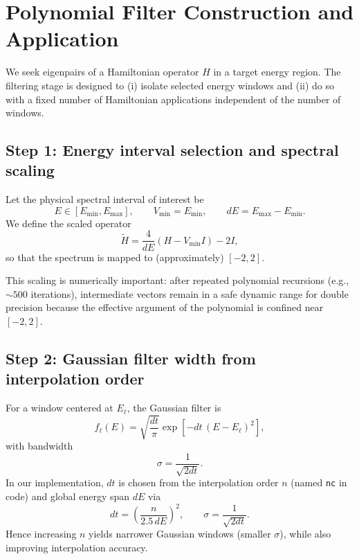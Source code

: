 \section{Polynomial Filter Construction and Application}
\label{sec:filter}

We seek eigenpairs of a Hamiltonian operator $H$ in a target energy region.
The filtering stage is designed to (i) isolate selected energy windows and
(ii) do so with a fixed number of Hamiltonian applications independent of the
number of windows.

\subsection{Step 1: Energy interval selection and spectral scaling}

Let the physical spectral interval of interest be
\begin{equation}
E \in [E_{\min},E_{\max}], \qquad
V_{\min}=E_{\min}, \qquad dE = E_{\max}-E_{\min}.
\end{equation}
We define the scaled operator
\begin{equation}
\widetilde{H} = \frac{4}{dE}(H - V_{\min}I) - 2I,
\label{eq:Hscale}
\end{equation}
so that the spectrum is mapped to (approximately) $[-2,2]$.

This scaling is numerically important: after repeated polynomial recursions
(e.g., $\sim 500$ iterations), intermediate vectors remain in a safe dynamic
range for double precision because the effective argument of the polynomial is
confined near $[-2,2]$.

\subsection{Step 2: Gaussian filter width from interpolation order}

For a window centered at $E_\ell$, the Gaussian filter is
\begin{equation}
f_\ell(E)=\sqrt{\frac{dt}{\pi}}\exp\!\left[-dt\,(E-E_\ell)^2\right],
\end{equation}
with bandwidth
\begin{equation}
\sigma = \frac{1}{\sqrt{2dt}}.
\end{equation}
In our implementation, $dt$ is chosen from the interpolation order $n$ (named
\texttt{nc} in code) and global energy span $dE$ via
\begin{equation}
dt = \left(\frac{n}{2.5\,dE}\right)^2,
\qquad
\sigma = \frac{1}{\sqrt{2dt}}.
\label{eq:dt_sigma}
\end{equation}
Hence increasing $n$ yields narrower Gaussian windows (smaller $\sigma$), while
also improving interpolation accuracy.


